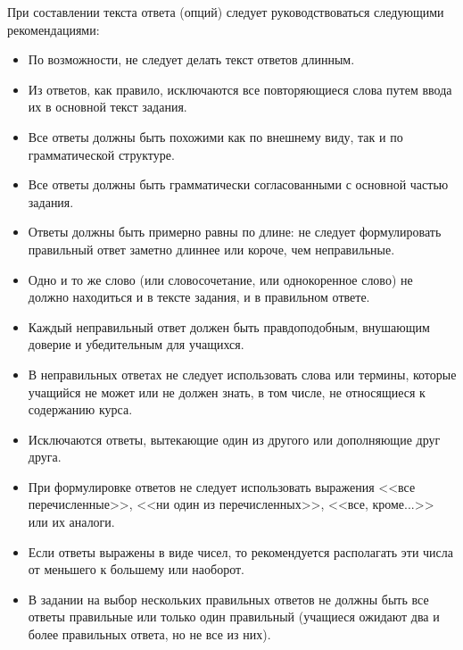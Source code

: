 При составлении текста ответа (опций) следует руководствоваться следующими рекомендациями:
\begin{itemize}
\item По возможности, не следует делать текст ответов длинным.
\item Из ответов, как правило, исключаются все повторяющиеся слова путем ввода их в основной текст задания.
\item Все ответы должны быть похожими как по внешнему виду, так и по грамматической структуре.
\item Все ответы должны быть грамматически согласованными с основной частью задания.
\item Ответы должны быть примерно равны по длине: не следует формулировать правильный ответ заметно длиннее или короче, чем неправильные.
\item Одно и то же слово (или словосочетание, или однокоренное слово) не должно находиться и в тексте задания, и в правильном ответе.
\item Каждый неправильный ответ должен быть правдоподобным, внушающим доверие и убедительным для учащихся.
\item В неправильных ответах не следует использовать слова или термины, которые учащийся не может или не должен знать, в том числе, не относящиеся к содержанию курса.
\item Исключаются ответы, вытекающие один из другого или дополняющие друг друга.
\item При формулировке ответов не следует использовать выражения <<все перечисленные>>, <<ни один из перечисленных>>, <<все, кроме...>> или их аналоги.
\item Если ответы выражены в виде чисел, то рекомендуется располагать эти числа от меньшего к большему или наоборот.
\item В задании на выбор нескольких правильных ответов не должны быть все ответы правильные или только один правильный (учащиеся ожидают два и более правильных ответа, но не все из них).
\end{itemize}

